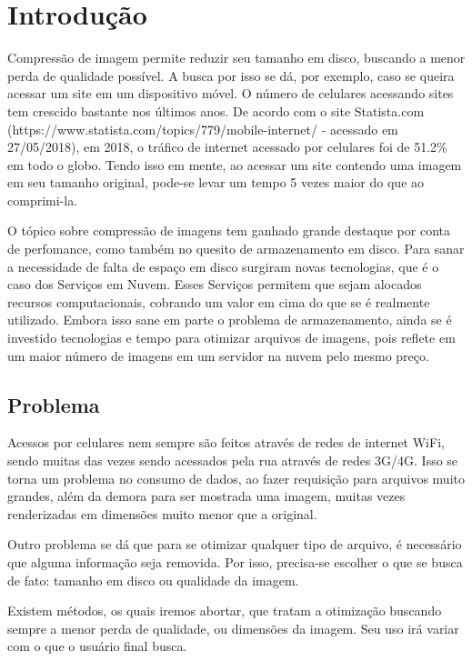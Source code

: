 \chapter{Introdução}
\label{c.introducao}

Compressão de imagem permite reduzir seu tamanho em disco, buscando a menor perda de qualidade possível. A busca por isso se dá, por exemplo, caso se queira acessar um site em um dispositivo móvel. O número de celulares acessando sites tem crescido bastante nos últimos anos. De acordo com o site Statista.com (https://www.statista.com/topics/779/mobile-internet/ - acessado em 27/05/2018), em 2018, o tráfico de internet acessado por celulares foi de 51.2\% em todo o globo. Tendo isso em mente, ao acessar um site contendo uma imagem em seu tamanho original, pode-se levar um tempo 5 vezes maior do que ao comprimi-la.

O tópico sobre compressão de imagens tem ganhado grande destaque por conta de perfomance, como também no quesito de armazenamento em disco. Para sanar a necessidade de falta de espaço em disco surgiram novas tecnologias, que é o caso dos Serviços em Nuvem. Esses Serviços permitem que sejam alocados recursos computacionais, cobrando um valor em cima do que se é realmente utilizado. Embora isso sane em parte o problema de armazenamento, ainda se é investido tecnologias e tempo para otimizar arquivos de imagens, pois reflete em um maior número de imagens em um servidor na nuvem pelo mesmo preço.

\section{Problema}
\label{s.problema}

Acessos por celulares nem sempre são feitos através de redes de internet WiFi, sendo muitas das vezes sendo acessados pela rua através de redes 3G/4G. Isso se torna um problema no consumo de dados, ao fazer requisição para arquivos muito grandes, além da demora para ser mostrada uma imagem, muitas vezes renderizadas em dimensões muito menor que a original.

Outro problema se dá que para se otimizar qualquer tipo de arquivo, é necessário que alguma informação seja removida. Por isso, precisa-se escolher o que se busca de fato: tamanho em disco ou qualidade da imagem.

Existem métodos, os quais iremos abortar, que tratam a otimização buscando sempre a menor perda de qualidade, ou dimensões da imagem. Seu uso irá variar com o que o usuário final busca.